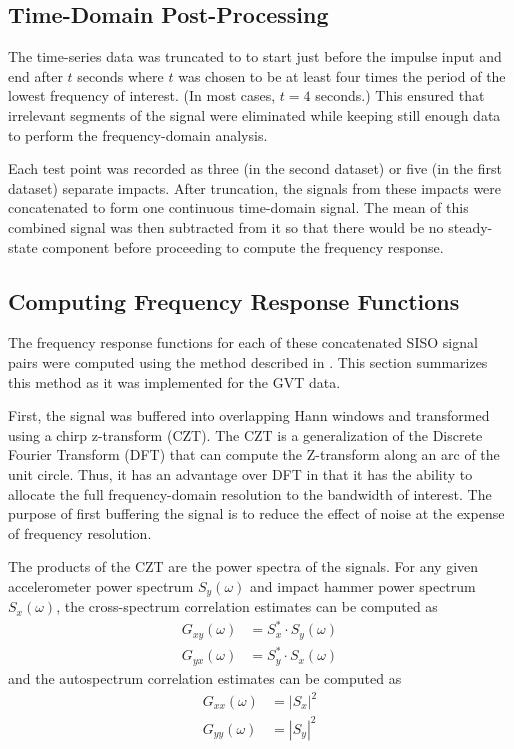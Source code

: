 \subsection{Time-Domain Post-Processing}

The time-series data was truncated to to start just before the impulse input and end after $t$ seconds where $t$ was chosen to be at least four times the period of the lowest frequency of interest. (In most cases, $t=4$ seconds.) This ensured that irrelevant segments of the signal were eliminated while keeping still enough data to perform the frequency-domain analysis.

Each test point was recorded as three (in the second dataset) or five (in the first dataset) separate impacts. After truncation, the signals from these impacts were concatenated to form one continuous time-domain signal. The mean of this combined signal was then subtracted from it so that there would be no steady-state component before proceeding to compute the frequency response.

\subsection{Computing Frequency Response Functions}

The frequency response functions for each of these concatenated SISO signal pairs were computed using the method described in \cite{Tischler2012}. This section summarizes this method as it was implemented for the GVT data.

First, the signal was buffered into overlapping Hann windows and transformed using a chirp z-transform (CZT). The CZT is a generalization of the Discrete Fourier Transform (DFT) that can compute the Z-transform along an arc of the unit circle. Thus, it has an advantage over DFT in that it has the ability to allocate the full frequency-domain resolution to the bandwidth of interest. The purpose of first buffering the signal is to reduce the effect of noise at the expense of frequency resolution.

The products of the CZT are the power spectra of the signals. For any given accelerometer power spectrum $S_y(\omega)$ and impact hammer power spectrum $S_x(\omega)$, the cross-spectrum correlation estimates can be computed as
\begin{align}
    G_{xy}(\omega) &= S_x^* \cdot S_y(\omega) \\
    G_{yx}(\omega) &= S_y^* \cdot S_x(\omega)
\end{align}
and the autospectrum correlation estimates can be computed as
\begin{align}
    G_{xx}(\omega) &= |S_x|^2	 \\
    G_{yy}(\omega) &= |S_y|^2
\end{align}

